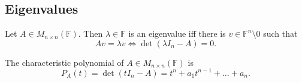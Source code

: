 \documentclass[../notes.tex]{subfiles}
\begin{document}

\subsection{Eigenvalues}

\begin{definition}[Eigenvalue]
    Let $A \in M_{n\times n}(\mathbb{F})$. Then $\lambda \in \mathbb{F}$ is an eigenvalue iff there is $v \in \mathbb{F}^n \setminus \qty{0}$ such that
    \[
        Av = \lambda v \Leftrightarrow \det(\lambda I_n - A) = 0
    .\]
\end{definition}

\begin{definition}
    The characteristic polynomial of $A \in M_{n\times n}(\mathbb{F})$ is
    \[
        P_A(t) = \det(t I_n - A) = t^n + a_1 t^{n-1} + \ldots + a_n
    .\]
\end{definition}
\end{document}
